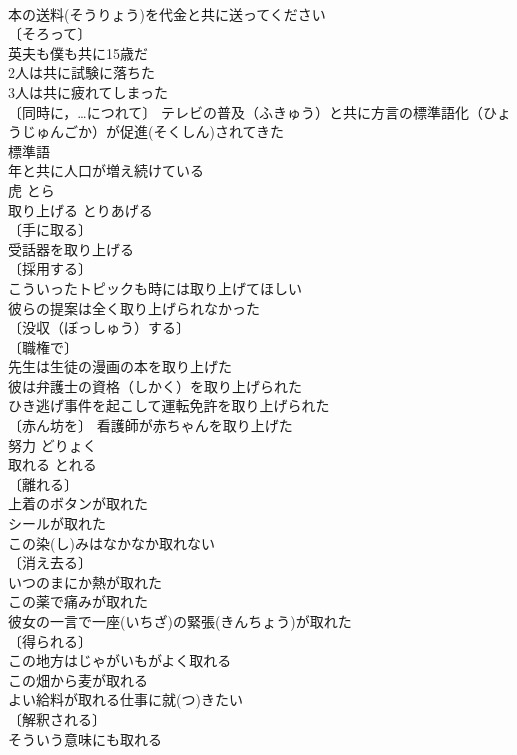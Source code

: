 \documentclass[8pt]{extreport}
\begin{document}
\begin{CJK}{UTF8}{min}
\\	本の送料(そうりょう)を代金と共に送ってください 
\\	〔そろって〕
\\	英夫も僕も共に15歳だ 
\\	2人は共に試験に落ちた 
\\	3人は共に疲れてしまった 
\\	〔同時に，…につれて〕 テレビの普及（ふきゅう）と共に方言の標準語化（ひょうじゅんごか）が促進(そくしん)されてきた 
\\	標準語　
\\	年と共に人口が増え続けている 
\\	虎	とら	
\\	取り上げる	とりあげる	
\\	〔手に取る〕
\\	受話器を取り上げる 
\\	〔採用する〕
\\	こういったトピックも時には取り上げてほしい 
\\	彼らの提案は全く取り上げられなかった 
\\	〔没収（ぼっしゅう）する〕
\\	〔職権で〕
\\	先生は生徒の漫画の本を取り上げた 
\\	彼は弁護士の資格（しかく）を取り上げられた 
\\	ひき逃げ事件を起こして運転免許を取り上げられた 
\\	〔赤ん坊を〕 看護師が赤ちゃんを取り上げた 
\\	努力	どりょく	
\\	取れる	とれる　
\\	〔離れる〕
\\	上着のボタンが取れた 
\\	シールが取れた 
\\	この染(し)みはなかなか取れない 
\\	〔消え去る〕　
\\	いつのまにか熱が取れた 
\\	この薬で痛みが取れた 
\\	彼女の一言で一座(いちざ)の緊張(きんちょう)が取れた 
\\	〔得られる〕　
\\	この地方はじゃがいもがよく取れる 
\\	この畑から麦が取れる 
\\	よい給料が取れる仕事に就(つ)きたい 
\\	〔解釈される〕　
\\	そういう意味にも取れる 

\end{CJK}
\end{document}
